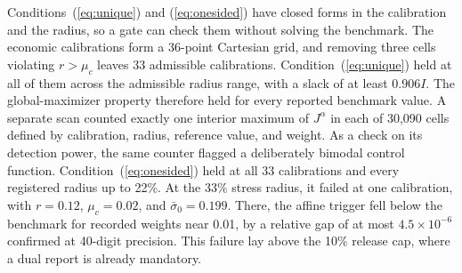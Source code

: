 \documentclass[5p,times,authoryear]{elsarticle}
\theoremstyle{plain}
\newcommand{\sbar}{\bar{\sigma}_0}
\begin{document}
Conditions~(\ref{eq:unique}) and (\ref{eq:onesided}) have closed forms in the calibration and the radius, so a gate can check them without solving the benchmark. The economic calibrations form a 36-point Cartesian grid, and removing three cells violating $r>\mu_c$ leaves 33 admissible calibrations. Condition~(\ref{eq:unique}) held at all of them across the admissible radius range, with a slack of at least $0.906I$. The global-maximizer property therefore held for every reported benchmark value. A separate scan counted exactly one interior maximum of $J^{\alpha}$ in each of 30,090 cells defined by calibration, radius, reference value, and weight. As a check on its detection power, the same counter flagged a deliberately bimodal control function. Condition~(\ref{eq:onesided}) held at all 33 calibrations and every registered radius up to 22\%. At the 33\% stress radius, it failed at one calibration, with $r=0.12$, $\mu_c=0.02$, and $\sbar=0.199$. There, the affine trigger fell below the benchmark for recorded weights near 0.01, by a relative gap of at most $4.5\times10^{-6}$ confirmed at 40-digit precision. This failure lay above the 10\% release cap, where a dual report is already mandatory.
\end{document}
